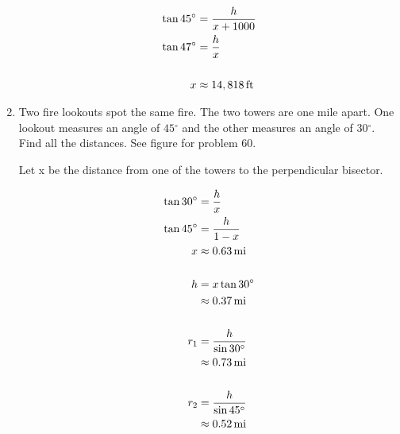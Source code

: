 \documentclass{exam}
\newcommand{\dg}{\ensuremath{^\circ}}
\begin{document}
\begin{enumerate}
      \begin{solution}
        \begin{align*}
          \tan 45 \dg &= \frac{h}{x + 1000} \\
          \tan 47 \dg &= \frac{h}{x} \\
          \\
          x &\approx \unit[14,818]{ft} \\
        \end{align*}
      \end{solution}

    \item Two fire lookouts spot the same fire.  The two towers are one mile apart.  One lookout measures an angle of
      $45 \dg$ and the other measures an angle of $30 \dg$.  Find all the distances.  See figure for problem 60.

      \begin{solution}
        Let x be the distance from one of the towers to the perpendicular bisector.

        \begin{align*}
          \tan 30 \dg & = \frac{h}{x} \\
          \tan 45 \dg & = \frac{h}{1 - x} \\
          x           & \approx \unit[0.63]{mi} \\
          \\
          h & = x \tan 30 \dg \\
            & \approx \unit[0.37]{mi} \\
          \\
          r_1 & = \frac{h}{\sin 30 \dg} \\
              & \approx \unit[0.73]{mi} \\
          \\
          r_2 & = \frac{h}{\sin 45 \dg} \\
              & \approx \unit[0.52]{mi} \\
        \end{align*}
      \end{solution}

  \end{enumerate}
\end{document}
